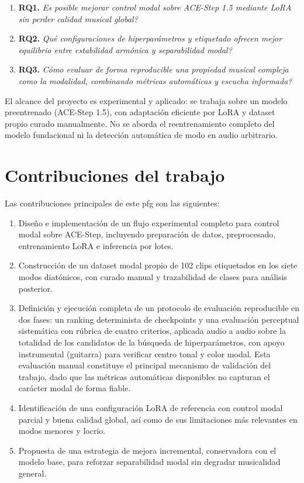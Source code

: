 \documentclass[%
    school=etsisi,%
    type=pfg,%
    degree=61CD,%
]{upm-report}
\begin{document}
\begin{enumerate}
    \item \textbf{RQ1.} \textit{\textquestiondown Es posible mejorar control modal sobre ACE-Step 1.5 mediante LoRA sin perder calidad musical global?}
    \item \textbf{RQ2.} \textit{\textquestiondown Qu\'e configuraciones de hiperpar\'ametros y etiquetado ofrecen mejor equilibrio entre estabilidad arm\'onica y separabilidad modal?}
    \item \textbf{RQ3.} \textit{\textquestiondown C\'omo evaluar de forma reproducible una propiedad musical compleja como la modalidad, combinando m\'etricas autom\'aticas y escucha informada?}
\end{enumerate}

El alcance del proyecto es experimental y aplicado: se trabaja sobre un modelo preentrenado (ACE-Step 1.5), con adaptaci\'on eficiente por LoRA y dataset propio curado manualmente. No se aborda el reentrenamiento completo del modelo fundacional ni la detecci\'on autom\'atica de modo en audio arbitrario.

\section{Contribuciones del trabajo}

Las contribuciones principales de este \gls{pfg} son las siguientes:

\begin{enumerate}
    \item Dise\~no e implementaci\'on de un flujo experimental completo para control modal sobre ACE-Step, incluyendo preparaci\'on de datos, preprocesado, entrenamiento LoRA e inferencia por lotes.
    \item Construcci\'on de un dataset modal propio de 102 clips etiquetados en los siete modos diat\'onicos, con curado manual y trazabilidad de clases para an\'alisis posterior.
    \item Definici\'on y ejecuci\'on completa de un protocolo de evaluaci\'on reproducible en dos fases: un ranking determinista de checkpoints y una evaluaci\'on perceptual sistem\'atica con r\'ubrica de cuatro criterios, aplicada audio a audio sobre la totalidad de los candidatos de la b\'usqueda de hiperpar\'ametros, con apoyo instrumental (guitarra) para verificar centro tonal y color modal. Esta evaluaci\'on manual constituye el principal mecanismo de validaci\'on del trabajo, dado que las m\'etricas autom\'aticas disponibles no capturan el car\'acter modal de forma fiable.
    \item Identificaci\'on de una configuraci\'on LoRA de referencia con control modal parcial y buena calidad global, as\'i como de sus limitaciones m\'as relevantes en modos menores y locrio.
    \item Propuesta de una estrategia de mejora incremental, conservadora con el modelo base, para reforzar separabilidad modal sin degradar musicalidad general.
\end{enumerate}
\end{document}
